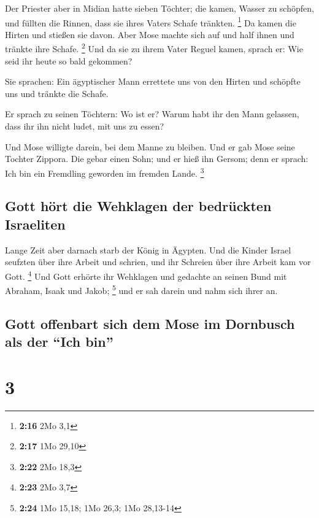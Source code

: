  Der Priester aber in Midian hatte sieben Töchter; die
kamen, Wasser zu schöpfen, und füllten die Rinnen, dass sie ihres Vaters
Schafe tränkten. \footnote{\textbf{2:16} 2Mo 3,1}  Da
kamen die Hirten und stießen sie davon. Aber Mose machte sich auf und
half ihnen und tränkte ihre Schafe. \footnote{\textbf{2:17} 1Mo 29,10}
 Und da sie zu ihrem Vater Reguel kamen, sprach er: Wie
seid ihr heute so bald gekommen?

 Sie sprachen: Ein ägyptischer Mann errettete uns von den
Hirten und schöpfte uns und tränkte die Schafe.

 Er sprach zu seinen Töchtern: Wo ist er? Warum habt ihr
den Mann gelassen, dass ihr ihn nicht ludet, mit uns zu essen?

 Und Mose willigte darein, bei dem Manne zu bleiben. Und
er gab Mose seine Tochter Zippora.  Die gebar einen Sohn;
und er hieß ihn Gersom; denn er sprach: Ich bin ein Fremdling geworden
im fremden Lande. \footnote{\textbf{2:22} 2Mo 18,3}

\hypertarget{gott-huxf6rt-die-wehklagen-der-bedruxfcckten-israeliten}{%
\subsection{Gott hört die Wehklagen der bedrückten
Israeliten}\label{gott-huxf6rt-die-wehklagen-der-bedruxfcckten-israeliten}}

 Lange Zeit aber darnach starb der König in Ägypten. Und
die Kinder Israel seufzten über ihre Arbeit und schrien, und ihr
Schreien über ihre Arbeit kam vor Gott. \footnote{\textbf{2:23} 2Mo 3,7}
 Und Gott erhörte ihr Wehklagen und gedachte an seinen
Bund mit Abraham, Isaak und Jakob; \footnote{\textbf{2:24} 1Mo 15,18;
  1Mo 26,3; 1Mo 28,13-14}  und er sah darein und nahm
sich ihrer an.

\hypertarget{gott-offenbart-sich-dem-mose-im-dornbusch-als-der-ich-bin}{%
\subsection{Gott offenbart sich dem Mose im Dornbusch als der ``Ich
bin''}\label{gott-offenbart-sich-dem-mose-im-dornbusch-als-der-ich-bin}}

\hypertarget{section-2}{%
\section{3}\label{section-2}}

